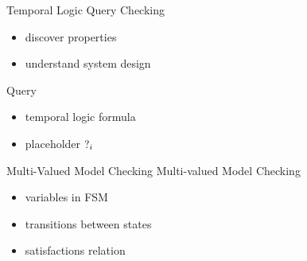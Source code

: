 
\begin{frame}{Temporal Logic Query Checking}
  \begin{itemize}
    \item discover properties
    \item understand system design
  \end{itemize}

  \vfill

  \begin{block}{Query}
    \begin{itemize}
      \item temporal logic formula
      \item placeholder $\operatorname{?}_i$
    \end{itemize}
  \end{block}
\end{frame}


\begin{frame}{Multi-Valued Model Checking}
  Multi-valued Model Checking
  \begin{itemize}
      \item variables in FSM
      \item transitions between states
      \item satisfactions relation
    \end{itemize}
\end{frame}
